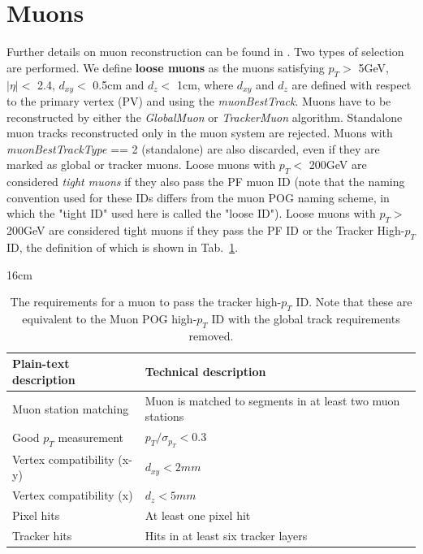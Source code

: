 \section{Muons}
Further details on muon reconstruction can be found in \cite{bib:CMS-AN-16-328}. Two types of selection are performed. We define \textbf{loose muons} as the muons satisfying $p_{T}>$ 5GeV, $|\eta|<$ 2.4, $d_{xy}<$ 0.5cm and $d_{z}<$ 1cm, where $d_{xy}$ and $d_{z}$ are defined with respect to the primary vertex (PV) and using the \textit{muonBestTrack}. Muons have to be reconstructed by either the \textit{GlobalMuon} or \textit{TrackerMuon} algorithm. Standalone muon tracks reconstructed only in the muon system are rejected. Muons with \textit{muonBestTrackType} == 2 (standalone) are also discarded, even if they are marked as global or tracker muons. Loose muons with $p_{T}<$ 200GeV are considered \textit{tight muons} if they also pass the PF muon ID (note that the naming convention used for these IDs differs from the muon POG naming scheme, in which the "tight ID" used here is called the "loose ID"). Loose muons with $p_{T}>$ 200GeV are considered tight muons if they pass the PF ID or the Tracker High-$p_{T}$ ID, the definition of which is shown in Tab.~\ref{tab:mu_tracker_highpTID_requirements}.

\begin{table}[hbtp]{16cm}
	\caption{The requirements for a muon to pass the tracker high-$p_{T}$ ID. Note that these are equivalent to the Muon POG high-$p_{T}$ ID with the global track requirements removed.}
	\centering
	\begin{tabular}{l|p{9cm}}
		\hline
		Plain-text description     & Technical description\\
		\hline
		Muon station matching      & Muon is matched to segments in at least two muon stations\\
		Good $p_{T}$ measurement   & $p_{T}/\sigma_{p_{T}} < 0.3$\\
		Vertex compatibility (x-y) & $d_{xy} < 2mm$\\
		Vertex compatibility (x)   & $d_{z}<5mm$\\
		Pixel hits                 & At least one pixel hit\\
		Tracker hits               & Hits in at least six tracker layers\\
		\hline
	\end{tabular}
	\label{tab:mu_tracker_highpTID_requirements}
\end{table}

